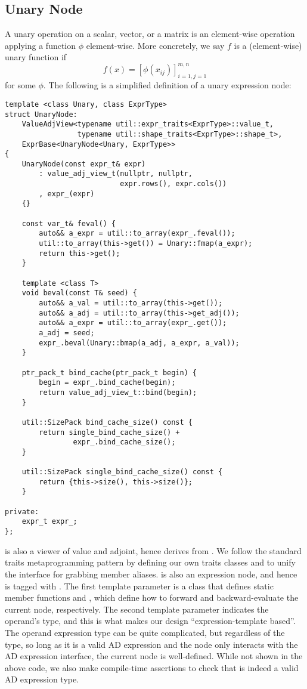 \subsection{Unary Node}\label{ssec:unary}

A unary operation on a scalar, vector, or a matrix is an element-wise 
operation applying a function $\phi$ element-wise.
More concretely, we say $f$ is a (element-wise) unary function if
\[
    f(x) = {[\phi(x_{ij})]}_{i=1,j=1}^{m,n}
\]
for some $\phi$.
The following is a simplified definition of a unary expression node:
\begin{lstlisting}[style=customcpp]
template <class Unary, class ExprType>
struct UnaryNode:
    ValueAdjView<typename util::expr_traits<ExprType>::value_t,
                 typename util::shape_traits<ExprType>::shape_t>,
    ExprBase<UnaryNode<Unary, ExprType>>
{
    UnaryNode(const expr_t& expr)
        : value_adj_view_t(nullptr, nullptr, 
                           expr.rows(), expr.cols())
        , expr_(expr)
    {}

    const var_t& feval() {
        auto&& a_expr = util::to_array(expr_.feval());
        util::to_array(this->get()) = Unary::fmap(a_expr);
        return this->get();
    }

    template <class T>
    void beval(const T& seed) {
        auto&& a_val = util::to_array(this->get());
        auto&& a_adj = util::to_array(this->get_adj());
        auto&& a_expr = util::to_array(expr_.get());
        a_adj = seed;
        expr_.beval(Unary::bmap(a_adj, a_expr, a_val));
    }

    ptr_pack_t bind_cache(ptr_pack_t begin) { 
        begin = expr_.bind_cache(begin);
        return value_adj_view_t::bind(begin);
    }

    util::SizePack bind_cache_size() const { 
        return single_bind_cache_size() + 
                expr_.bind_cache_size();
    }

    util::SizePack single_bind_cache_size() const {
        return {this->size(), this->size()};
    }

private:
    expr_t expr_;
};
\end{lstlisting}
 is also a viewer of value and adjoint,
hence derives from .
We follow the standard traits metaprogramming pattern by defining our own
traits classes  and  to unify the interface
for grabbing member aliases.
 is also an expression node, and hence is tagged with .
The first template parameter  is a class that defines
static member functions  and ,
which define how to forward and backward-evaluate the current node, respectively.
The second template parameter indicates the operand's type,
and this is what makes our design ``expression-template based''.
The operand expression type can be quite complicated, but regardless of the type,
so long as it is a valid AD expression and 
the node only interacts with the AD expression interface, the current node is well-defined.
While not shown in the above code, we also make compile-time assertions
to check that  is indeed a valid AD expression type.

